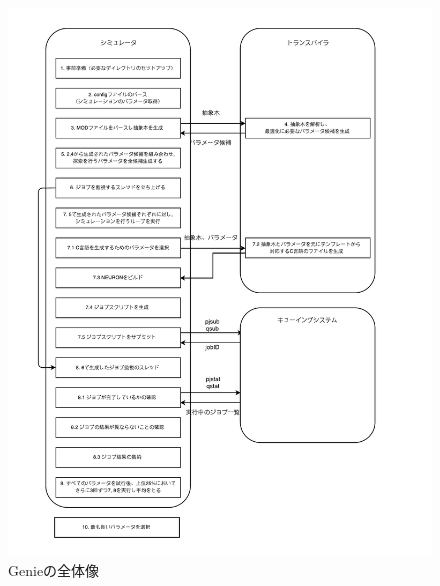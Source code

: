 \begin{figure}[h!]
    \includegraphics[width=1.1\textwidth]{./images/Genie.pdf}
    \caption{Genieの全体像}
    \label{fig:simulator-image}
\end{figure}~\\

\clearpage

